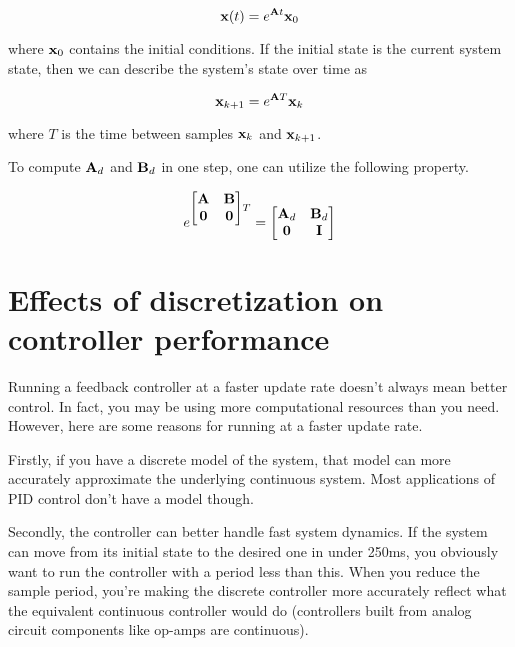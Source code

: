 \begin{equation*}
  \mathbf{x}(t) = e^{\mathbf{A}t} \mathbf{x}_0
\end{equation*}

where $\mathbf{x}_0$ contains the initial conditions. If the initial state is the
current system state, then we can describe the system's state over time as

\begin{equation*}
  \mathbf{x}_{k+1} = e^{\mathbf{A}T} \mathbf{x}_k
\end{equation*}

where $T$ is the time between samples $\mathbf{x}_k$ and $\mathbf{x}_{k+1}$.

To compute $\mathbf{A}_d$ and $\mathbf{B}_d$ in one step, one can utilize the
following property.

\begin{equation*}
  e^{
  \begin{bmatrix}
    \mathbf{A} & \mathbf{B} \\
    \mathbf{0} & \mathbf{0}
  \end{bmatrix}T} =
  \begin{bmatrix}
    \mathbf{A}_d & \mathbf{B}_d \\
    \mathbf{0} & \mathbf{I}
  \end{bmatrix}
\end{equation*}

\section{Effects of discretization on controller performance}

Running a feedback controller at a faster update rate doesn't always mean better
control. In fact, you may be using more computational resources than you need.
However, here are some reasons for running at a faster update rate.

Firstly, if you have a discrete model of the system, that model can more
accurately approximate the underlying continuous system. Most applications of
PID control don't have a model though.

Secondly, the controller can better handle fast system dynamics. If the system
can move from its initial state to the desired one in under 250ms, you obviously
want to run the controller with a period less than this. When you reduce the
sample period, you're making the discrete controller more accurately reflect
what the equivalent continuous controller would do (controllers built from
analog circuit components like op-amps are continuous).

